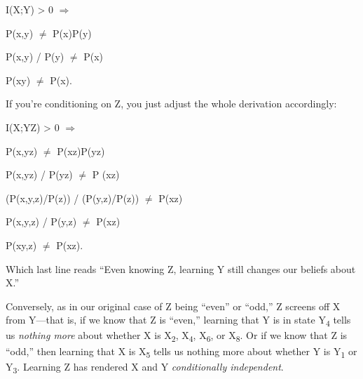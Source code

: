 {\centering
 I(X;Y) {\textgreater} 0 $\Rightarrow $
\par}


\bigskip

{\centering
 P(x,y) ${\neq}$ P(x)P(y)
\par}


\bigskip

{\centering
 P(x,y) / P(y) ${\neq}$ P(x)
\par}


\bigskip

{\centering
 P(x{\textbar}y) ${\neq}$ P(x).
\par}


\bigskip

{
 If you're conditioning on Z, you just adjust the
whole derivation accordingly:}

{\centering
 I(X;Y{\textbar}Z) {\textgreater} 0 $\Rightarrow $
\par}


\bigskip

{\centering
 P(x,y{\textbar}z) ${\neq}$ P(x{\textbar}z)P(y{\textbar}z)
\par}


\bigskip

{\centering
 P(x,y{\textbar}z) / P(y{\textbar}z) ${\neq}$ P (x{\textbar}z)
\par}


\bigskip

{\centering
 (P(x,y,z)/P(z)) / (P(y,z)/P(z)) ${\neq}$ P(x{\textbar}z)
\par}


\bigskip

{\centering
 P(x,y,z) / P(y,z) ${\neq}$ P(x{\textbar}z)
\par}


\bigskip

{\centering
 P(x{\textbar}y,z) ${\neq}$ P(x{\textbar}z).
\par}


\bigskip

{
 Which last line reads ``Even knowing Z, learning
Y still changes our beliefs about X.''}

{
 Conversely, as in our original case of Z being
``even'' or
``odd,'' Z screens off X from
Y---that is, if we know that Z is
``even,'' learning that Y is in
state Y\textsubscript{4} tells us \textit{nothing more} about whether X
is X\textsubscript{2}, X\textsubscript{4}, X\textsubscript{6}, or
X\textsubscript{8}. Or if we know that Z is
``odd,'' then learning that X is
X\textsubscript{5} tells us nothing more about whether Y is
Y\textsubscript{1} or Y\textsubscript{3}. Learning Z has rendered X and
Y \textit{conditionally independent}.}

